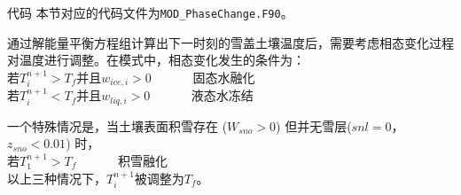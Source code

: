 \begin{mymdframed}{代码}
本节对应的代码文件为\texttt{MOD\_PhaseChange.F90}。
\end{mymdframed}

通过解能量平衡方程组计算出下一时刻的雪盖土壤温度后，需要考虑相态变化过程对温度进行调整。在模式中，相态变化发生的条件为：\\
若$T_i^{n+1}>T_f$并且$w_{ice,i}>0$ \ \   \ \  \ \   固态水融化\\
若$T_i^{n+1}<T_f$并且$w_{liq,i}>0$  \ \   \ \  \ \         液态水冻结

一个特殊情况是，当土壤表面积雪存在 ($W_{sno}>0$) 但并无雪层($snl=0$，$z_{sno}<0.01$) 时，\\
若$T_1^{n+1}>T_f$      \ \   \ \  \ \                 积雪融化\\
%
以上三种情况下，$T_i^{n+1}$被调整为$T_f$。


